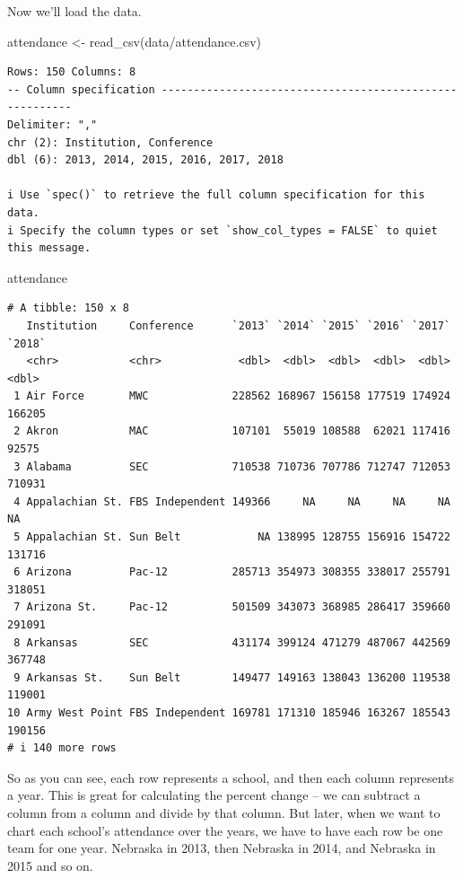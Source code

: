 \documentclass[
  letterpaper,
  DIV=11,
  numbers=noendperiod]{scrreprt}
\newenvironment{Shaded}{\begin{snugshade}}{\end{snugshade}}
\newcommand{\FunctionTok}[1]{\textcolor[rgb]{0.28,0.35,0.67}{#1}}
\newcommand{\NormalTok}[1]{\textcolor[rgb]{0.00,0.23,0.31}{#1}}
\newcommand{\OtherTok}[1]{\textcolor[rgb]{0.00,0.23,0.31}{#1}}
\newcommand{\StringTok}[1]{\textcolor[rgb]{0.13,0.47,0.30}{#1}}
\begin{document}
Now we'll load the data.

\begin{Shaded}
\begin{Highlighting}[]
\NormalTok{attendance }\OtherTok{\textless{}{-}} \FunctionTok{read\_csv}\NormalTok{(}\StringTok{\textquotesingle{}data/attendance.csv\textquotesingle{}}\NormalTok{)}
\end{Highlighting}
\end{Shaded}

\begin{verbatim}
Rows: 150 Columns: 8
-- Column specification --------------------------------------------------------
Delimiter: ","
chr (2): Institution, Conference
dbl (6): 2013, 2014, 2015, 2016, 2017, 2018

i Use `spec()` to retrieve the full column specification for this data.
i Specify the column types or set `show_col_types = FALSE` to quiet this message.
\end{verbatim}

\begin{Shaded}
\begin{Highlighting}[]
\NormalTok{attendance}
\end{Highlighting}
\end{Shaded}

\begin{verbatim}
# A tibble: 150 x 8
   Institution     Conference      `2013` `2014` `2015` `2016` `2017` `2018`
   <chr>           <chr>            <dbl>  <dbl>  <dbl>  <dbl>  <dbl>  <dbl>
 1 Air Force       MWC             228562 168967 156158 177519 174924 166205
 2 Akron           MAC             107101  55019 108588  62021 117416  92575
 3 Alabama         SEC             710538 710736 707786 712747 712053 710931
 4 Appalachian St. FBS Independent 149366     NA     NA     NA     NA     NA
 5 Appalachian St. Sun Belt            NA 138995 128755 156916 154722 131716
 6 Arizona         Pac-12          285713 354973 308355 338017 255791 318051
 7 Arizona St.     Pac-12          501509 343073 368985 286417 359660 291091
 8 Arkansas        SEC             431174 399124 471279 487067 442569 367748
 9 Arkansas St.    Sun Belt        149477 149163 138043 136200 119538 119001
10 Army West Point FBS Independent 169781 171310 185946 163267 185543 190156
# i 140 more rows
\end{verbatim}

So as you can see, each row represents a school, and then each column
represents a year. This is great for calculating the percent change --
we can subtract a column from a column and divide by that column. But
later, when we want to chart each school's attendance over the years, we
have to have each row be one team for one year. Nebraska in 2013, then
Nebraska in 2014, and Nebraska in 2015 and so on.
\end{document}
